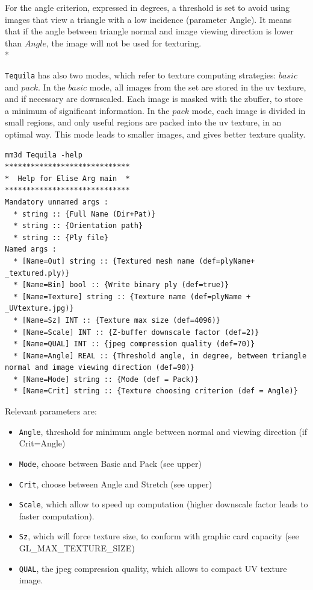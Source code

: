For the angle criterion, expressed in degrees, a threshold is set to avoid using images that view a triangle with a low incidence (parameter Angle).
It means that if the angle between triangle normal and image viewing direction is lower than $Angle$, the image will not be used for texturing.\\*

{\tt Tequila} has also two modes, which refer to texture computing strategies: $basic$ and $pack$. In the $basic$ mode, all images from the set are stored in the uv texture, and if necessary are downscaled. Each image is masked with the zbuffer, to store a minimum of significant information.
In the $pack$ mode, each image is divided in small regions, and only useful regions are packed into the uv texture, in an optimal way. This mode leads to smaller images, and gives better texture quality.

\begin{verbatim}
mm3d Tequila -help
*****************************
*  Help for Elise Arg main  *
*****************************
Mandatory unnamed args :
  * string :: {Full Name (Dir+Pat)}
  * string :: {Orientation path}
  * string :: {Ply file}
Named args :
  * [Name=Out] string :: {Textured mesh name (def=plyName+ _textured.ply)}
  * [Name=Bin] bool :: {Write binary ply (def=true)}
  * [Name=Texture] string :: {Texture name (def=plyName + _UVtexture.jpg)}
  * [Name=Sz] INT :: {Texture max size (def=4096)}
  * [Name=Scale] INT :: {Z-buffer downscale factor (def=2)}
  * [Name=QUAL] INT :: {jpeg compression quality (def=70)}
  * [Name=Angle] REAL :: {Threshold angle, in degree, between triangle normal and image viewing direction (def=90)}
  * [Name=Mode] string :: {Mode (def = Pack)}
  * [Name=Crit] string :: {Texture choosing criterion (def = Angle)}
\end{verbatim}

Relevant parameters are:
\begin{itemize}
\item {\tt Angle}, threshold for minimum angle between normal and viewing direction (if Crit=Angle)
\item {\tt Mode}, choose between Basic and Pack (see upper)
\item {\tt Crit}, choose between Angle and Stretch (see upper)
\item {\tt Scale}, which allow to speed up computation (higher downscale factor leads to faster computation).
\item {\tt Sz}, which will force texture size, to conform with graphic card capacity (see GL\_MAX\_TEXTURE\_SIZE)
\item {\tt QUAL}, the jpeg compression quality, which allows to compact UV texture image.
\end{itemize}

